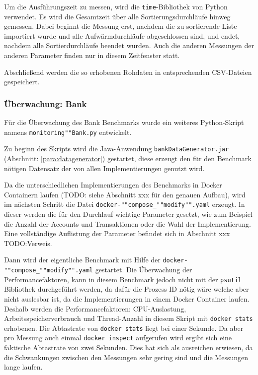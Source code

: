 \documentclass[fontsize=12pt,paper=a4,twoside=semi,parskip=half-,headsepline,headinclude]{scrreprt}
\begin{document}
Um die Ausführungszeit zu messen, wird die \texttt{time}-Bibliothek von Python verwendet. Es wird die Gesamtzeit über alle Sortierungsdurchläufe hinweg gemessen. Dabei beginnt die Messung erst, nachdem die zu sortierende Liste importiert wurde und alle Aufwärmdurchläufe abgeschlossen sind, und endet, nachdem alle Sortierdurchläufe beendet wurden. Auch die anderen Messungen der anderen Parameter finden nur in diesem Zeitfenster statt. 

Abschließend werden die so erhobenen Rohdaten in entsprechenden CSV-Dateien gespeichert.

\subsubsection{Überwachung: Bank}
\label{subsubsec:monibank}

Für die Überwachung des Bank Benchmarks wurde ein weiteres Python-Skript namens \texttt{monitoring""Bank.py} entwickelt.

Zu beginn des Skripts wird die Java-Anwendung \texttt{bankDataGenerator.jar} (Abschnitt: \ref{para:datagenerator}) gestartet, diese erzeugt den für den Benchmark nötigen Datensatz der von allen Implementierungen genutzt wird. 

Da die unterschiedlichen Implementierungen des Benchmarks in Docker Containern laufen (TODO: siehe Abschnitt xxx für den genauen Aufbau), wird im nächsten Schritt die Datei \texttt{docker-""compose\_""modify"".yaml} erzeugt. In dieser werden die für den Durchlauf wichtige Parameter gesetzt, wie zum Beispiel die Anzahl der Accounts und Transaktionen oder die Wahl der Implementierung. Eine vollständige Auflistung der Parameter befindet sich in Abschnitt xxx TODO:Verweis.

Dann wird der eigentliche Benchmark mit Hilfe der \texttt{docker-""compose\_""modify"".yaml} gestartet. Die Überwachung der Performancefaktoren, kann in diesem Benchmark jedoch nicht mit der \texttt{psutil} Bibliothek durchgeführt werden, da dafür die Prozess ID nötig wäre welche aber nicht auslesbar ist, da die Implementierungen in einem Docker Container laufen. Deshalb werden die Performancefaktoren: CPU-Auslastung, Arbeitsspeicherverbrauch und Thread-Anzahl in diesem Skript mit \texttt{docker stats} erhobenen. Die Abtastrate von \texttt{docker stats} liegt bei einer Sekunde. Da aber pro Messung auch einmal \texttt{docker inspect} aufgerufen wird ergibt sich eine faktische Abtastrate von zwei Sekunden. Dies hat sich als ausreichen erwiesen, da die Schwankungen zwischen den Messungen sehr gering sind und die Messungen lange laufen. 
\end{document}
